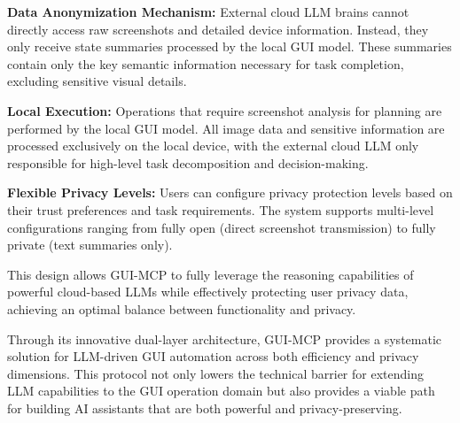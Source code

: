\noindent\textbf{Data Anonymization Mechanism:} External cloud LLM brains cannot directly access raw screenshots and detailed device information. Instead, they only receive state summaries processed by the local GUI model. These summaries contain only the key semantic information necessary for task completion, excluding sensitive visual details.

\noindent\textbf{Local Execution:} Operations that require screenshot analysis for planning are performed by the local GUI model. All image data and sensitive information are processed exclusively on the local device, with the external cloud LLM only responsible for high-level task decomposition and decision-making.

\noindent\textbf{Flexible Privacy Levels:} Users can configure privacy protection levels based on their trust preferences and task requirements. The system supports multi-level configurations ranging from fully open (direct screenshot transmission) to fully private (text summaries only).

This design allows GUI-MCP to fully leverage the reasoning capabilities of powerful cloud-based LLMs while effectively protecting user privacy data, achieving an optimal balance between functionality and privacy.

Through its innovative dual-layer architecture, GUI-MCP provides a systematic solution for LLM-driven GUI automation across both efficiency and privacy dimensions. This protocol not only lowers the technical barrier for extending LLM capabilities to the GUI operation domain but also provides a viable path for building AI assistants that are both powerful and privacy-preserving.

